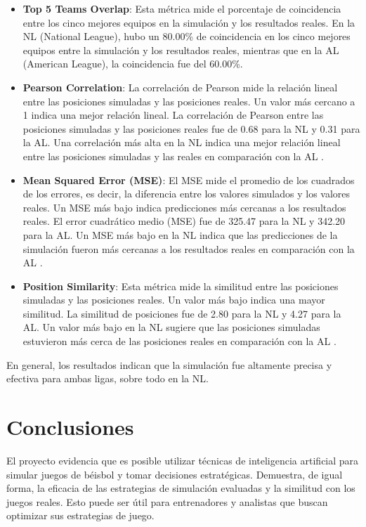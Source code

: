 \documentclass[runningheads]{llncs}
\begin{document}
    \begin{itemize}
        \item \textbf{Top 5 Teams Overlap}: Esta métrica mide el porcentaje de coincidencia entre los cinco mejores equipos en la simulación y los resultados reales. En la NL (National League), hubo un 80.00\% de coincidencia en los cinco mejores equipos entre la simulación y los resultados reales, mientras que en la AL (American League), la coincidencia fue del 60.00\%.
        \item \textbf{Pearson Correlation}: La correlación de Pearson mide la relación lineal entre las posiciones simuladas y las posiciones reales. Un valor más cercano a 1 indica una mejor relación lineal. La correlación de Pearson entre las posiciones simuladas y las posiciones reales fue de 0.68 para la NL y 0.31 para la AL. Una correlación más alta en la NL indica una mejor relación lineal entre las posiciones simuladas y las reales en comparación con la AL \cite{pearson1895}.
        \item \textbf{Mean Squared Error (MSE)}: El MSE mide el promedio de los cuadrados de los errores, es decir, la diferencia entre los valores simulados y los valores reales. Un MSE más bajo indica predicciones más cercanas a los resultados reales. El error cuadrático medio (MSE) fue de 325.47 para la NL y 342.20 para la AL. Un MSE más bajo en la NL indica que las predicciones de la simulación fueron más cercanas a los resultados reales en comparación con la AL \cite{mse}.
        \item \textbf{Position Similarity}: Esta métrica mide la similitud entre las posiciones simuladas y las posiciones reales. Un valor más bajo indica una mayor similitud. La similitud de posiciones fue de 2.80 para la NL y 4.27 para la AL. Un valor más bajo en la NL sugiere que las posiciones simuladas estuvieron más cerca de las posiciones reales en comparación con la AL \cite{positionsimilarity}.
    \end{itemize}

    En general, los resultados indican que la simulación fue altamente precisa y efectiva para ambas ligas, sobre todo en la NL. 

\section{Conclusiones}
    El proyecto evidencia que es posible utilizar técnicas de inteligencia artificial para simular juegos de béisbol y tomar decisiones estratégicas.
    Demuestra, de igual forma, la eficacia de las estrategias de simulación evaluadas y la similitud con los juegos reales. Esto puede ser útil para entrenadores y analistas que buscan optimizar sus estrategias de juego.



\end{document}
